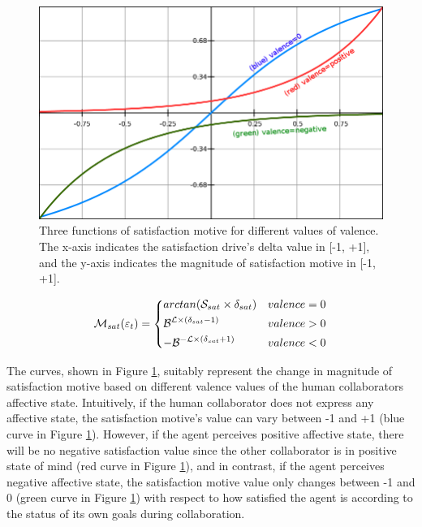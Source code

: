\documentclass[12pt]{report}
\begin{document}
\begin{figure}[t]
  \centering
  \includegraphics[width=1\textwidth]{figure/satisfaction_motive_functions.png}
  \caption{Three functions of satisfaction motive for different values of
  valence. The x-axis indicates the satisfaction drive's delta value in [-1,
  +1], and the y-axis indicates the magnitude of satisfaction motive in [-1,
  +1].}
  \label{fig:satisfaction-motive-functions}
\end{figure}

\begin{equation}
    \mathcal{M}_{sat}(\varepsilon_t)= 
    \begin{dcases}
       arctan (\mathcal{S}_{sat} \times \delta_{sat})      & valence = 0 \\
       \mathcal{B}^{\mathcal{L} \times (\delta_{sat}-1)}   & valence > 0 \\
       -\mathcal{B}^{-\mathcal{L} \times (\delta_{sat}+1)} & valence < 0
    \end{dcases}
    \label{eqn:satisfaction_motive}
\end{equation}

The curves, shown in Figure \ref{fig:satisfaction-motive-functions},
suitably represent the change in magnitude of satisfaction motive based on
different valence values of the human collaborators affective state.
Intuitively, if the human collaborator does not express any affective state, the
satisfaction motive's value can vary between -1 and +1 (blue curve in Figure
\ref{fig:satisfaction-motive-functions}). However, if the agent perceives
positive affective state, there will be no negative satisfaction value since the
other collaborator is in positive state of mind (red curve in Figure
\ref{fig:satisfaction-motive-functions}), and in contrast, if the agent
perceives negative affective state, the satisfaction motive value only changes
between -1 and 0 (green curve in Figure \ref{fig:satisfaction-motive-functions})
with respect to how satisfied the agent is according to the status of its own
goals during collaboration.
\end{document}
